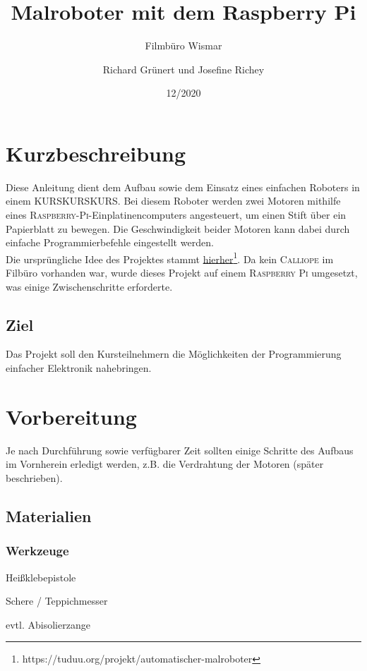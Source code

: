 \documentclass[12pt]{article}
\title{Malroboter mit dem Raspberry Pi}
\subtitle{Filmbüro Wismar}
\author{Richard Grünert und Josefine Richey}
\date{12/2020}
\begin{document}
\maketitle

\tableofcontents

\pagebreak

\section{Kurzbeschreibung}
Diese Anleitung dient dem Aufbau sowie dem Einsatz eines einfachen Roboters in einem KURSKURSKURS. Bei diesem Roboter werden zwei Motoren mithilfe eines \textsc{Raspberry-Pi}-Einplatinencomputers angesteuert, um einen Stift über ein  Papierblatt zu bewegen. Die Geschwindigkeit beider Motoren kann dabei durch einfache Programmierbefehle eingestellt werden.\\

Die ursprüngliche Idee des Projektes stammt \href{https://tuduu.org/projekt/automatischer-malroboter}{hierher}\footnote[1]{https://tuduu.org/projekt/automatischer-malroboter}. Da kein \textsc{Calliope} im Filbüro vorhanden war, wurde dieses Projekt auf einem \textsc{Raspberry Pi} umgesetzt, was einige Zwischenschritte erforderte.\\

\subsection{Ziel}
Das Projekt soll den Kursteilnehmern die Möglichkeiten der Programmierung einfacher Elektronik nahebringen.

\section{Vorbereitung}
Je nach Durchführung sowie verfügbarer Zeit sollten einige Schritte des Aufbaus im Vornherein erledigt werden, z.B. die Verdrahtung der Motoren (später beschrieben).\\

\subsection{Materialien}

\subsubsection{Werkzeuge}
\begin{checklist}
    \item Heißklebepistole
    \item Schere / Teppichmesser
    \item evtl. Abisolierzange
\end{checklist}
\end{document}
